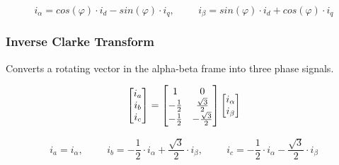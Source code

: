 \begin{equation}
    i_{\alpha} = cos(\varphi) \cdot i_{d} - sin(\varphi) \cdot i_{q}
    , \hspace{1cm}
    i_{\beta} = sin(\varphi) \cdot i_{d} + cos(\varphi) \cdot i_{q}
    \label{eq:inverse_park_transformation}
\end{equation}

\subsubsection{Inverse Clarke Transform}
Converts a rotating vector in the alpha-beta frame into three phase signals. 

\begin{equation}
    \centering
    \begin{bmatrix}
        i_{a} \\ 
        i_{b} \\ 
        i_{c}
    \end{bmatrix}
    =
    \begin{bmatrix}
        1 & 0 \\
        - \frac{1}{2} & \frac{\sqrt{3}}{2} \\
        - \frac{1}{2} & - \frac{\sqrt{3}}{2}
    \end{bmatrix}
    \begin{bmatrix}
        i_{\alpha} \\ 
        i_{\beta}
    \end{bmatrix}
\end{equation}


\begin{equation}
    i_{a} = i_{\alpha}
    , \hspace{1cm}
    i_{b} = -\frac{1}{2} \cdot i_{\alpha} + \frac{\sqrt{3}}{2} \cdot i_{\beta}
    , \hspace{1cm}
    i_{c} = -\frac{1}{2} \cdot i_{\alpha} - \frac{\sqrt{3}}{2} \cdot i_{\beta}
    \label{eq:inverse_clarke_transformation}
\end{equation}